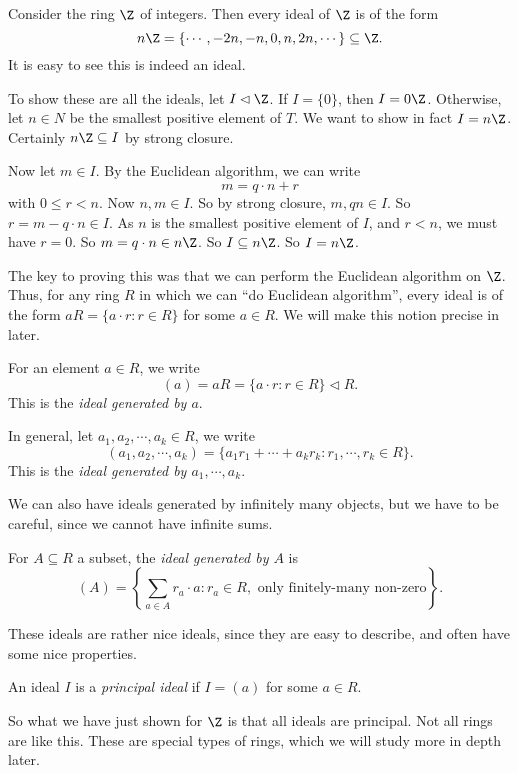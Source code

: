 \documentclass[a4paper]{article}
\begin{document}
\begin{eg}
  Consider the ring $\Z$ of integers. Then every ideal of $\Z$ is of the form
  \[
    n\Z = \{\cdots, -2n, -n, 0, n, 2n, \cdots\} \subseteq \Z.
  \]
  It is easy to see this is indeed an ideal.

  To show these are all the ideals, let $I \lhd \Z$. If $I = \{0\}$, then $I = 0\Z$. Otherwise, let $n \in N$ be the smallest positive element of $T$. We want to show in fact $I = n\Z$. Certainly $n\Z \subseteq I$ by strong closure.

  Now let $m \in I$. By the Euclidean algorithm, we can write
  \[
    m = q \cdot n + r
  \]
  with $0 \leq r < n$. Now $n,m \in I$. So by strong closure, $m, qn \in I$. So $r = m - q\cdot n \in I$. As $n$ is the smallest positive element of $I$, and $r < n$, we must have $r = 0$. So $m = q\cdot n \in n\Z$. So $I \subseteq n\Z$. So $I = n\Z$.
\end{eg}
The key to proving this was that we can perform the Euclidean algorithm on $\Z$. Thus, for any ring $R$ in which we can ``do Euclidean algorithm'', every ideal is of the form $aR = \{a \cdot r: r \in R\}$ for some $a \in R$. We will make this notion precise in later.

\begin{defi}
  For an element $a \in R$, we write
  \[
    (a) = aR = \{a \cdot r: r \in R\} \lhd R.
  \]
  This is the \emph{ideal generated by $a$}.

  In general, let $a_1, a_2, \cdots, a_k \in R$, we write
  \[
    (a_1, a_2, \cdots, a_k) = \{ a_1 r_1 + \cdots + a_k r_k : r_1, \cdots, r_k \in R\}.
  \]
  This is the \emph{ideal generated by $a_1, \cdots, a_k$}.
\end{defi}
We can also have ideals generated by infinitely many objects, but we have to be careful, since we cannot have infinite sums.
\begin{defi}
  For $A \subseteq R$ a subset, the \emph{ideal generated by $A$} is
  \[
    (A) = \left\{\sum_{a \in A} r_a \cdot a: r_a \in R, \text{ only finitely-many non-zero}\right\}.
  \]
\end{defi}

These ideals are rather nice ideals, since they are easy to describe, and often have some nice properties.
\begin{defi}
  An ideal $I$ is a \emph{principal ideal} if $I = (a)$ for some $a \in R$.
\end{defi}
So what we have just shown for $\Z$ is that all ideals are principal. Not all rings are like this. These are special types of rings, which we will study more in depth later.
\end{document}
